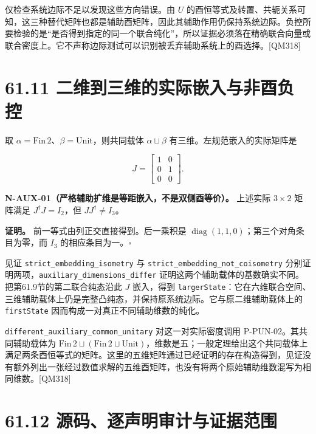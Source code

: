 \documentclass[
  11pt,
  oneside]{book}
\begin{document}
仅检查系统边际不足以发现这些方向错误。由 \(U\)
的酉恒等式及转置、共轭关系可知，这三种替代矩阵也都是辅助酉矩阵，因此其辅助作用仍保持系统边际。负控所要检验的是``是否得到指定的同一个联合纯化''，所以证据必须落在精确联合向量或联合密度上。它不声称边际测试可以识别被丢弃辅助系统上的酉选择。{[}QM318{]}

\section{61.11 二维到三维的实际嵌入与非酉负控}

取 \(\alpha=\mathrm{Fin}\,2\)、\(\beta=\mathrm{Unit}\)，则共同载体
\(\alpha\sqcup\beta\) 有三维。左规范嵌入的实际矩阵是

\[
J=\begin{bmatrix}1&0\\0&1\\0&0\end{bmatrix}.
\]

\protect\hypertarget{n-aux-01}{}{}

\textbf{N-AUX-01（严格辅助扩维是等距嵌入，不是双侧酉等价）。} 上述实际
\(3\times2\) 矩阵满足 \(J^\dagger J=I_2\)，但 \(JJ^\dagger\ne I_3\)。

\textbf{证明。} 前一等式由列正交直接得到。后一乘积是
\(\operatorname{diag}(1,1,0)\)；第三个对角条目为零，而 \(I_3\)
的相应条目为一。\(\square\)

见证 \texttt{strict\_\allowbreak embedding\_\allowbreak isometry} 与
\texttt{strict\_\allowbreak embedding\_\allowbreak not\_\allowbreak coisometry}
分别证明两项，\texttt{auxiliary\_\allowbreak dimensions\_\allowbreak differ}
证明这两个辅助载体的基数确实不同。把第61.9节的第二联合纯态沿此 \(J\)
嵌入，得到
\texttt{larger\allowbreak State}：它在六维联合空间、三维辅助载体上仍是完整凸纯态，并保持原系统边际。它与原二维辅助载体上的
\texttt{first\allowbreak State} 因而构成一对真正不同辅助维数的纯化。

\texttt{different\_\allowbreak auxiliary\_\allowbreak common\_\allowbreak unitary} 对这一对实际密度调用
P-PUN-02。其共同辅助载体为
\(\mathrm{Fin}\,2\sqcup(\mathrm{Fin}\,2\sqcup\mathrm{Unit})\)，维数是五；一般定理给出这个共同载体上满足两条酉恒等式的矩阵。这里的五维矩阵通过已经证明的存在构造得到，见证没有额外列出一张经过数值求解的五维酉矩阵，也没有将两个原始辅助维数混写为相同维数。{[}QM318{]}

\section{61.12 源码、逐声明审计与证据范围}
\end{document}
